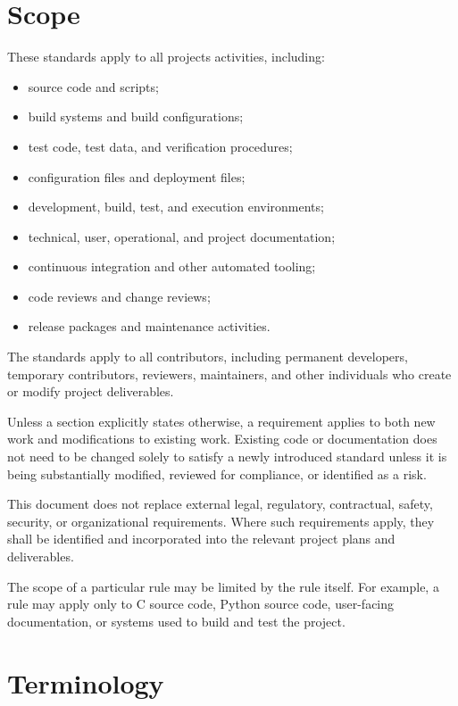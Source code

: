 \documentclass[11pt,a4paper]{article}
\begin{document}
\section{Scope}
%
These standards apply to all projects activities, including:
\begin{itemize}
    \item source code and scripts;
    \item build systems and build configurations;
    \item test code, test data, and verification procedures;
    \item configuration files and deployment files;
    \item development, build, test, and execution environments;
    \item technical, user, operational, and project documentation;
    \item continuous integration and other automated tooling;
    \item code reviews and change reviews;
    \item release packages and maintenance activities.
\end{itemize}

The standards apply to all contributors, including permanent developers, temporary contributors, reviewers, maintainers, and other individuals who create or modify project deliverables.

Unless a section explicitly states otherwise, a requirement applies to both new work and modifications to existing work. Existing code or documentation does not need to be changed solely to satisfy a newly introduced standard unless it is being substantially modified, reviewed for compliance, or identified as a risk.

This document does not replace external legal, regulatory, contractual, safety, security, or organizational requirements. Where such requirements apply, they shall be identified and incorporated into the relevant project plans and deliverables.

The scope of a particular rule may be limited by the rule itself. For example, a rule may apply only to C source code, Python source code, user-facing documentation, or systems used to build and test the project.

\section{Terminology}

\end{document}
